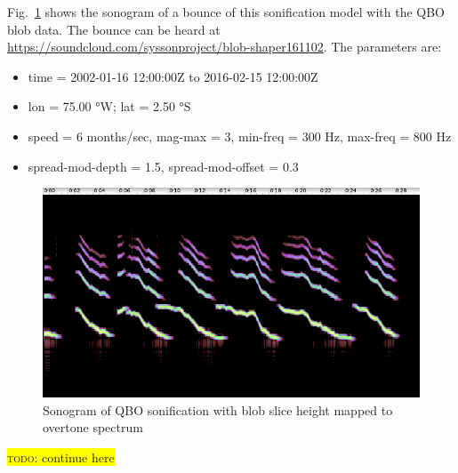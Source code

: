 \documentclass[11pt,a4paper]{article}
\newcommand{\todo}[1]{\colorbox{yellow}{\textsc{todo}: #1}}
\newcommand{\figref}[1]{Fig.~\ref{#1}}
\begin{document}
\figref{fig:blob-shaper-161102-sono} shows the sonogram of a bounce of this sonification model with the QBO blob data. The bounce can be heard at \url{https://soundcloud.com/syssonproject/blob-shaper161102}. The parameters are:
%
\begin{itemize}
\item time = 2002-01-16 12:00:00Z to 2016-02-15 12:00:00Z
\item lon = 75.00 °W; lat = 2.50 °S
\item speed = 6 months/sec, mag-max = 3, min-freq = 300 Hz, max-freq  = 800 Hz
\item spread-mod-depth = 1.5, spread-mod-offset = 0.3
\end{itemize}

\begin{figure}
\includegraphics[width=\textwidth]{figures/blob-shaper161102.png}
\caption{Sonogram of QBO sonification with blob slice height mapped to overtone spectrum}
\label{fig:blob-shaper-161102-sono}
\end{figure}
%

\todo{continue here}

\end{document}
